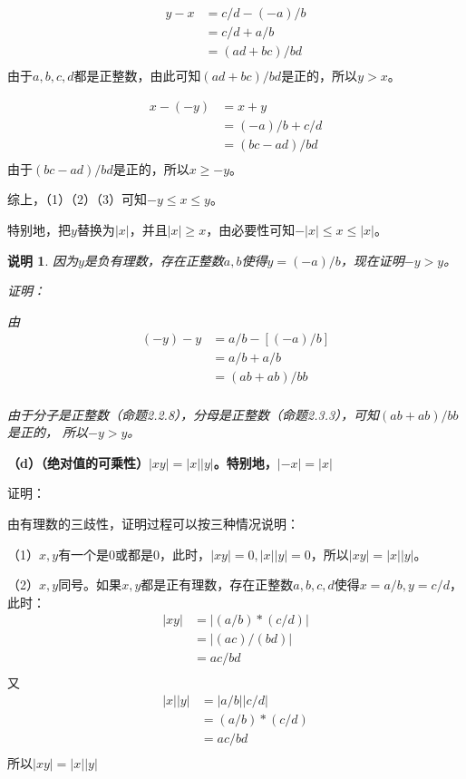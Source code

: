 \documentclass{article}
\theoremstyle{mystyle}
\newtheorem*{zremark}{说明}
\begin{document}
\begin{align*}
  y - x & = c/d - (-a)/b   \\
        & = c/d + a/b      \\
        & = (ad + bc) / bd \\
\end{align*}
由于$a,b,c,d$都是正整数，由此可知$(ad + bc) / bd$是正的，所以$y > x$。

\begin{align*}
  x - (-y) & = x + y        \\
           & = (-a)/b + c/d \\
           & = (bc - ad)/bd \\
\end{align*}
由于$(bc - ad)/bd$是正的，所以$x \geq -y$。

综上，（1）（2）（3）可知$-y \leq x \leq y$。

特别地，把$y$替换为$|x|$，并且$|x| \geq x$，由必要性可知$-|x| \leq x \leq |x|$。

\begin{zgraytheorem}
  \begin{zremark}
    因为$y$是负有理数，存在正整数$a,b$使得$y = (-a)/b$，现在证明$-y > y$。

    证明：

    由
    \begin{align*}
      (-y) - y & = a/b - [(-a)/b] \\
               & = a/b + a/b      \\
               & = (ab + ab)/bb   \\
    \end{align*}

    由于分子是正整数（命题2.2.8），分母是正整数（命题2.3.3），可知$(ab + ab)/bb$是正的，
    所以$-y > y$。
  \end{zremark}
\end{zgraytheorem}

\textbf{（d）（绝对值的可乘性）$|xy|=|x||y|$。特别地，$|-x|=|x|$}

证明：

由有理数的三歧性，证明过程可以按三种情况说明：

（1）$x,y$有一个是0或都是0，此时，$|xy|=0,|x||y|=0$，所以$|xy|=|x||y|$。

（2）$x,y$同号。如果$x,y$都是正有理数，存在正整数$a,b,c,d$使得$x=a/b,y=c/d$，此时：
\begin{align*}
  |xy| & = |(a/b) * (c/d)| \\
       & = |(ac)/(bd)|     \\
       & = ac/bd           \\
\end{align*}
又
\begin{align*}
  |x||y| & = |a/b||c/d|    \\
         & = (a/b) * (c/d) \\
         & = ac/bd         \\
\end{align*}
所以$|xy|=|x||y|$
\end{document}
